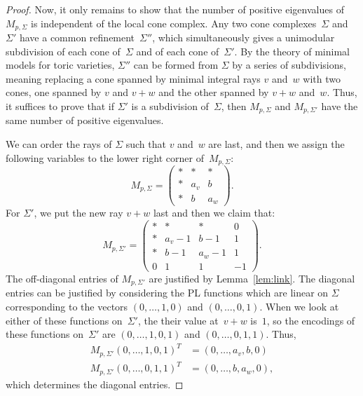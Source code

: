 \documentclass[11pt]{amsart}
\theoremstyle{definition}
\begin{document}
\begin{proof}
Now, it only remains to show that the number of positive eigenvalues of
$M_{p,\Sigma}$ is independent of the local cone complex. Any two cone
complexes~$\Sigma$ and~$\Sigma'$ have a common refinement~$\Sigma''$, which
simultaneously gives a unimodular subdivision of each cone of~$\Sigma$ and of
each cone of~$\Sigma'$. By the theory of minimal models for toric varieties,
$\Sigma''$ can be formed from $\Sigma$ by a series of subdivisions, meaning
replacing a cone spanned by minimal integral rays $v$ and~$w$ with two cones,
one spanned by $v$ and $v+w$ and the other spanned by $v+w$ and~$w$. Thus, it
suffices to prove that if $\Sigma'$ is a subdivision of~$\Sigma$, then
$M_{p,\Sigma}$ and $M_{p,\Sigma'}$ have the same number of positive eigenvalues.

We can order the rays of $\Sigma$ such that $v$ and~$w$ are last, and then we
assign the following variables to the lower right corner of~$M_{p,\Sigma}$:
\begin{equation*}
M_{p,\Sigma} = 
\begin{pmatrix}
* & * & * \\
* & a_v & b \\
* & b & a_w
\end{pmatrix}.
\end{equation*}
For $\Sigma'$, we put the new ray $v + w$ last and then we claim that:
\begin{equation*}
M_{p,\Sigma'} = 
\begin{pmatrix}
* & * & * & 0 \\
* & a_v - 1 & b - 1 & 1 \\
* & b-1 & a_w - 1 & 1 \\
0 & 1 & 1 & -1
\end{pmatrix}.
\end{equation*}
The off-diagonal entries of $M_{p,\Sigma'}$ are justified by
Lemma~\ref{lem:link}. The diagonal entries can be justified by
considering the PL functions which are linear on $\Sigma$ corresponding to the
vectors $(0, \ldots, 1, 0)$ and $(0, \ldots, 0, 1)$. When we look at either of
these functions on~$\Sigma'$, the their value at~$v+w$ is~$1$, so the encodings
of these functions on~$\Sigma'$ are $(0, \ldots, 1, 0, 1)$ and $(0, \ldots, 0,
1, 1)$. Thus, 
\begin{align*}
M_{p,\Sigma'} (0, \ldots, 1, 0, 1)^T &= (0, \ldots, a_v, b, 0) \\
M_{p,\Sigma'} (0, \ldots, 0, 1, 1)^T &= (0, \ldots, b, a_w, 0),
\end{align*}
which determines the diagonal entries.


\end{proof}
\end{document}
